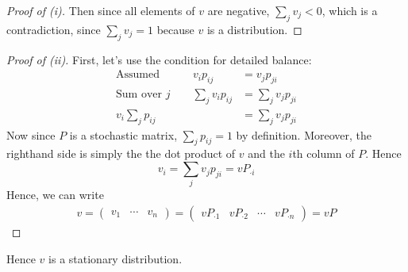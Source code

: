 \documentclass[12pt]{article}
\theoremstyle{plain}
\theoremstyle{definition}
\theoremstyle{remark}
\begin{document}
\begin{enumerate}
\begin{proof}[Proof of (i)]
  Then since all elements of $v$ are negative, $\sum_j v_j < 0$, which
  is a contradiction, since $\sum_j v_j = 1$ because $v$ is a
  distribution.
  \end{proof}

  \begin{proof}[Proof of (ii)] First, let's use the condition for
    detailed balance:
    \begin{align*}
      \text{Assumed} \qquad \quad v_i p_{ij} &= v_j p_{ji} \\
      \text{Sum over $j$} \qquad \sum_j v_i p_{ij} &= \sum_j v_j p_{ji} \\
       v_i\sum_j  p_{ij} &= \sum_j v_j p_{ji}
    \end{align*}
    Now since $P$ is a stochastic matrix, $\sum_j p_{ij}=1$ by
    definition. Moreover, the righthand side is simply the the dot
    product of $v$ and the $i$th column of $P$.  Hence
    \begin{equation}
      \label{q2.vi}
      v_i = \sum_j v_j p_{ji} = v P_{\cdot i}
    \end{equation}
    Hence, we can write
    \begin{align*}
      v =
      \begin{pmatrix}
        v_1 & \cdots & v_n
      \end{pmatrix} =
      \begin{pmatrix}
        v P_{\cdot 1} & v P_{\cdot 2} & \cdots & v P_{\cdot n}
      \end{pmatrix}
        = vP
    \end{align*}
  \end{proof}
  Hence $v$ is a stationary distribution.


\end{enumerate}
\end{document}
